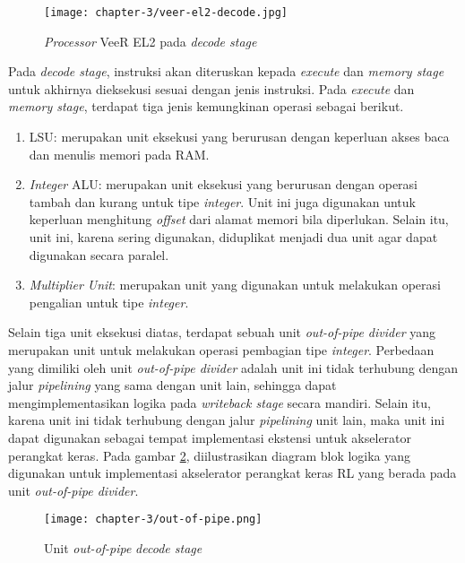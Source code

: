 \begin{figure}[H]
	\centering
	\texttt{[image: chapter-3/veer-el2-decode.jpg]}
	\caption{\textit{Processor} VeeR EL2 pada \textit{decode stage}}
	\label{fig:veer-el2-decode}
\end{figure}

Pada \textit{decode stage}, instruksi akan diteruskan kepada \textit{execute} dan \textit{memory stage} untuk akhirnya dieksekusi sesuai dengan jenis instruksi. Pada \textit{execute} dan \textit{memory stage}, terdapat tiga jenis kemungkinan operasi sebagai berikut.


\begin{enumerate}
	\item \ac{LSU}: merupakan unit eksekusi yang berurusan dengan keperluan akses baca dan menulis memori pada \ac{RAM}.
	\item \textit{Integer} \ac{ALU}: merupakan unit eksekusi yang berurusan dengan operasi tambah dan kurang untuk tipe \textit{integer}. Unit ini juga digunakan untuk keperluan menghitung \textit{offset} dari alamat memori bila diperlukan. Selain itu, unit ini, karena sering digunakan, diduplikat menjadi dua unit agar dapat digunakan secara paralel.
	\item \textit{Multiplier Unit}: merupakan unit yang digunakan untuk melakukan operasi pengalian untuk tipe \textit{integer}.
\end{enumerate}

Selain tiga unit eksekusi diatas, terdapat sebuah unit \textit{out-of-pipe divider} yang merupakan unit untuk melakukan operasi pembagian tipe \textit{integer}. Perbedaan yang dimiliki oleh unit \textit{out-of-pipe divider} adalah unit ini tidak terhubung dengan jalur \textit{pipelining} yang sama dengan unit lain, sehingga dapat mengimplementasikan logika pada \textit{writeback stage} secara mandiri. Selain itu, karena unit ini tidak terhubung dengan jalur \textit{pipelining} unit lain, maka unit ini dapat digunakan sebagai tempat implementasi ekstensi untuk akselerator perangkat keras. Pada gambar \ref{fig:out-of-pipe}, diilustrasikan diagram blok logika yang digunakan untuk implementasi akselerator perangkat keras \ac{RL} yang berada pada unit \textit{out-of-pipe divider}.

\begin{figure}[H]
	\centering
	\texttt{[image: chapter-3/out-of-pipe.png]}
	\caption{Unit \textit{out-of-pipe} \textit{decode stage}}
	\label{fig:out-of-pipe}
\end{figure}

